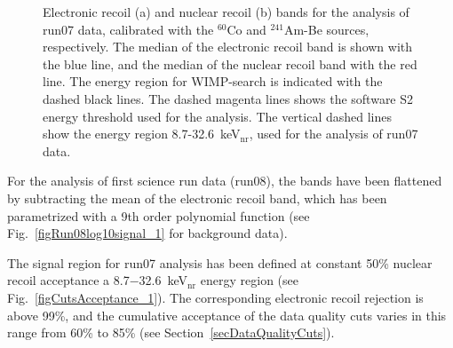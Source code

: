 \begin{figure}[!h]
\centering
{}
\caption[Electronic recoil and nuclear recoil bands for the analysis of run07 data]{Electronic recoil (a) and nuclear recoil (b) bands for the analysis of run07 data, calibrated with the $^{60}$Co and $^{241}$Am-Be sources, respectively. The median of the electronic recoil band is shown with the blue line, and the median of the nuclear recoil band with the red line. The energy region for WIMP-search is indicated with the dashed black lines. The dashed magenta lines shows the software S2 energy threshold used for the analysis. The vertical  dashed lines show the energy region 8.7-32.6~keV$_{\mathrm{nr}}$, used for the analysis of run07 data.}
\label{figRun07bands}
\end{figure}

For the analysis of first science run data (run08), the bands have been flattened by subtracting the mean of the electronic recoil band, which has been parametrized with a 9th order polynomial function (see Fig.~\ref{figRun08log10signal_1} for background data).

The signal region for run07 analysis has been defined at constant 50\% nuclear recoil acceptance a 8.7$-$32.6~keV$_{\mathrm{nr}}$ energy region (see Fig.~\ref{figCutsAcceptance_1}). The corresponding electronic recoil rejection is above 99\%, and the cumulative acceptance of the data quality cuts varies in this range from 60\% to 85\% (see Section~\ref{secDataQualityCuts}).


